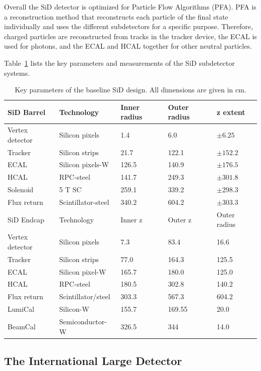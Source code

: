 Overall the SiD detector is optimized for Particle Flow Algorithms (PFA).
PFA is a reconstruction method that reconstructs each particle of the final state individually and uses the different subdetectors for a specific purpose.
Therefore, charged particles are reconstructed from tracks in the tracker device, the ECAL is used for photons, and the ECAL and HCAL together for other neutral particles. 

Table~\ref{tab:KeyParametersSiD} lists the key parameters and measurements of the SiD subdetector systems.

\begin{table}
\caption{Key parameters of the baseline SiD design. All dimensions are given in cm.\cite{SiDBkgNote}}
\label{tab:KeyParametersSiD}
\centering
\begin{tabularx}{0.81\textwidth}{l|llll}
\hline\hline
SiD Barrel & Technology & Inner radius & Outer radius & z extent\\
\hline
Vertex detector & Silicon pixels & 1.4 & 6.0 & $\pm 6.25$ \\
Tracker & Silicon strips & 21.7 & 122.1 & $\pm 152.2$ \\
ECAL & Silicon pixels-W & 126.5 & 140.9 & $\pm 176.5$ \\
HCAL & RPC-steel & 141.7 & 249.3 & $\pm 301.8$ \\
Solenoid & 5 T SC & 259.1 & 339.2 & $\pm 298.3$ \\
Flux return & Scintillator-steel & 340.2 & 604.2 & $\pm 303.3$ \\
\hline
SiD Endcap & Technology & Inner z & Outer z & Outer radius\\
\hline
Vertex detector & Silicon pixels & 7.3 & 83.4 & 16.6 \\
Tracker & Silicon strips & 77.0 & 164.3 & 125.5 \\
ECAL & Silicon pixel-W & 165.7 & 180.0 & 125.0 \\
HCAL & RPC-steel & 180.5 & 302.8 & 140.2 \\
Flux return & Scintillator/steel & 303.3 & 567.3 & 604.2 \\
LumiCal & Silicon-W & 155.7 & 169.55 &  20.0 \\
BeamCal & Semiconductor-W & 326.5 & 344 & 14.0 \\
\hline\hline
\end{tabularx}
\end{table}

\subsection{The International Large Detector}

